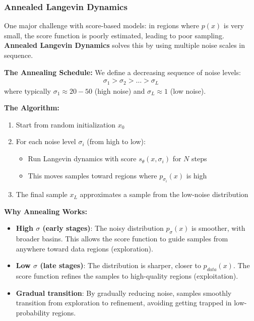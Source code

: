 \documentclass[12pt,a4paper]{article}
\begin{document}
\subsubsection{Annealed Langevin Dynamics}

One major challenge with score-based models: in regions where $p(x)$ is very small, the score function is poorly estimated, leading to poor sampling. \textbf{Annealed Langevin Dynamics} solves this by using multiple noise scales in sequence.

\textbf{The Annealing Schedule:} We define a decreasing sequence of noise levels:
\begin{align}
\sigma_1 > \sigma_2 > \ldots > \sigma_L
\end{align}
where typically $\sigma_1 \approx 20-50$ (high noise) and $\sigma_L \approx 1$ (low noise).

\textbf{The Algorithm:}
\begin{enumerate}
    \item Start from random initialization $x_0$
    \item For each noise level $\sigma_i$ (from high to low):
    \begin{itemize}
        \item Run Langevin dynamics with score $s_\theta(x, \sigma_i)$ for $N$ steps
        \item This moves samples toward regions where $p_{\sigma_i}(x)$ is high
    \end{itemize}
    \item The final sample $x_L$ approximates a sample from the low-noise distribution
\end{enumerate}

\textbf{Why Annealing Works:}
\begin{itemize}
    \item \textbf{High $\sigma$ (early stages)}: The noisy distribution $p_\sigma(x)$ is smoother, with broader basins. This allows the score function to guide samples from anywhere toward data regions (exploration).
    
    \item \textbf{Low $\sigma$ (late stages)}: The distribution is sharper, closer to $p_{data}(x)$. The score function refines the samples to high-quality regions (exploitation).
    
    \item \textbf{Gradual transition}: By gradually reducing noise, samples smoothly transition from exploration to refinement, avoiding getting trapped in low-probability regions.
\end{itemize}
\end{document}
